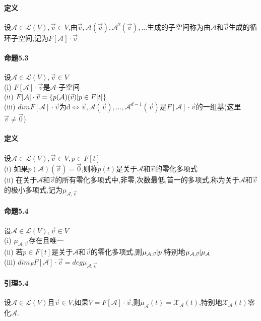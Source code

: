 \documentclass{ctexart}
\begin{document}
\paragraph{定义}
设$\mathcal{A}\in \mathcal{L}(V),\vec{v}\in V$,由$\vec{v},\mathcal{A}(\vec{v}),\mathcal{A}^{2}(\vec{v}),...$生成的子空间称为由$\mathcal{A}$和$\vec{v}$生成的循环子空间,记为$F[\mathcal{A}]\cdot \vec{v}$

\paragraph{命题5.3}
设$\mathcal{A}\in\mathcal{L}(V),\vec{v}\in V$\\
(i) $F[\mathcal{A}]\cdot \vec{v}$是$\mathcal{A}$-子空间\\
(ii) $F[\mathcal{A}]\cdot\vec{v} = \{ p(\mathcal{A})(\vec{v})\arrowvert p\in F[t] \}$\\
(iii) $dimF[\mathcal{A}]\cdot \vec{v}$为d$\Leftrightarrow \vec{v},\mathcal{A}(\vec{v}),...,\mathcal{A}^{d-1}(\vec{v})$是$F[\mathcal{A}]\cdot \vec{v}$的一组基(这里$\vec{v} \ne \vec{0}$)

\paragraph{定义}
设$\mathcal{A}\in \mathcal{L}(V),\vec{v} \in V,p \in F[t]$\\
(i) 如果$p(\mathcal{A})(\vec{v}) = \vec{0}$,则称$p(t)$是关于$\mathcal{A}$和$\vec{v}$的零化多项式\\
(ii) 在关于$\mathcal{A}$和$\vec{v}$的所有零化多项式中,非零,次数最低,首一的多项式,称为关于$\mathcal{A}$和$\vec{v}$的极小多项式,记为$\mu_{\mathcal{A},\vec{v}}$

\paragraph{命题5.4}
设$\mathcal{A} \in \mathcal{L}(V),\vec{v} \in V$\\
(i) $\mu_{\mathcal{A},\vec{v}}$存在且唯一\\
(ii) 若$p \in F[t]$是关于$\mathcal{A}$和$\vec{v}$的零化多项式,则$\mu_{\mathcal{A},\vec{v}}\arrowvert p$.特别地$\mu_{\mathcal{A},\vec{v}}\arrowvert \mu_{\mathcal{A}}$\\
(iii) $dim_{F}F[\mathcal{A}]\cdot \vec{v} = deg\mu_{\mathcal{A},\vec{v}}$\\

\paragraph{引理5.4}
设$\mathcal{A} \in \mathcal{L}(V)$且$\vec{v} \in V$,如果$V = F[\mathcal{A}] \cdot \vec{v}$,则$\mu_{\mathcal{A}}(t) = \mathcal{X}_{\mathcal{A}}(t)$,特别地$\mathcal{X}_{\mathcal{A}}(t)$零化$\mathcal{A}$.
\end{document}
